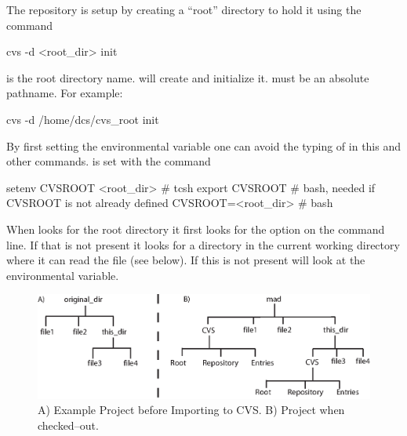 The \cvs repository is setup by creating a ``root'' directory
to hold it using the command
\begin{example}
  cvs -d <root_dir> init
\end{example}
 is the root directory name. \cvs will create
 and initialize it.  must be an
absolute pathname. For example:
\begin{example}
  cvs -d /home/dcs/cvs_root init
\end{example}

By first setting the  environmental variable one can avoid
the typing of  in this and other commands.
 is set with the command
\begin{example}
  setenv CVSROOT <root_dir> # tcsh
  export CVSROOT            # bash, needed if CVSROOT is not already defined
  CVSROOT=<root_dir>        # bash
\end{example}
When \cvs looks for the \cvs root directory it first looks for the
 option on the command line. If that is not present it looks
for a  directory in the current working directory where it can
read the  file (see below). If this is not present \cvs
will look at the  environmental variable.

\begin{figure}[tb]
  \begin{centering}
  \includegraphics{cvs.eps}
  \caption{A) Example Project before Importing to CVS. B) Project when checked--out.}
  \label{f:cvs}
  \end{centering}
\end{figure}

